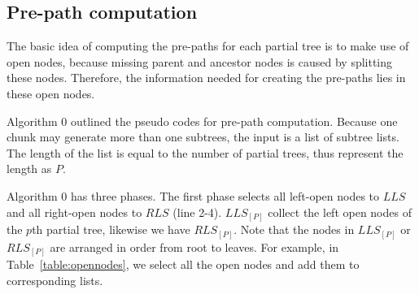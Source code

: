 \subsection{Pre-path computation}

The basic idea of computing the pre-paths for each partial tree is to 
make use of open nodes, because missing parent and ancestor nodes 
is caused by splitting these nodes. Therefore, the information needed 
for creating the pre-paths lies in these open nodes. 

Algorithm 0 outlined the pseudo codes for pre-path computation. 
Because one chunk may generate more than one subtrees, the input is a list of subtree lists. 
The length of the list is equal to the number of partial trees, thus represent the length as $P$.

Algorithm 0 has three phases.
The first phase selects all left-open nodes to $LLS$ and all right-open nodes to $RLS$ (line 2-4). 
$LLS_{[P]}$ collect the left open nodes of the $p$th partial tree, likewise we have $RLS_{[P]}$.
Note that the nodes in $LLS_{[P]}$ or $RLS_{[P]}$ are arranged in order from root to leaves.
For example, in Table~\ref{table:opennodes}, we select all the open nodes and add them 
to corresponding lists. 
 
